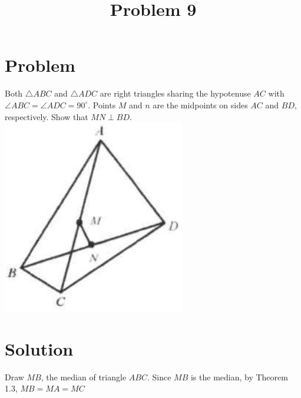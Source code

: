 \documentclass{article}
\title{Problem 9}
\date{}
\begin{document}
\maketitle

\section*{Problem}
Both \(\triangle A B C\) and \(\triangle A D C\) are right triangles sharing the hypotenuse \(A C\) with \(\angle A B C=\angle A D C=90^{\circ}\). Points \(M\) and \(n\) are the midpoints on sides \(A C\) and \(B D\), respectively. Show that \(M N \perp B D\).\\
\centering
\includegraphics[width=\textwidth]{images/problem_image_1.jpg}

\section*{Solution}
Draw \(M B\), the median of triangle \(A B C\). Since \(M B\) is the median, by Theorem 1.3, \(M B=M A=M C\)
\end{document}
